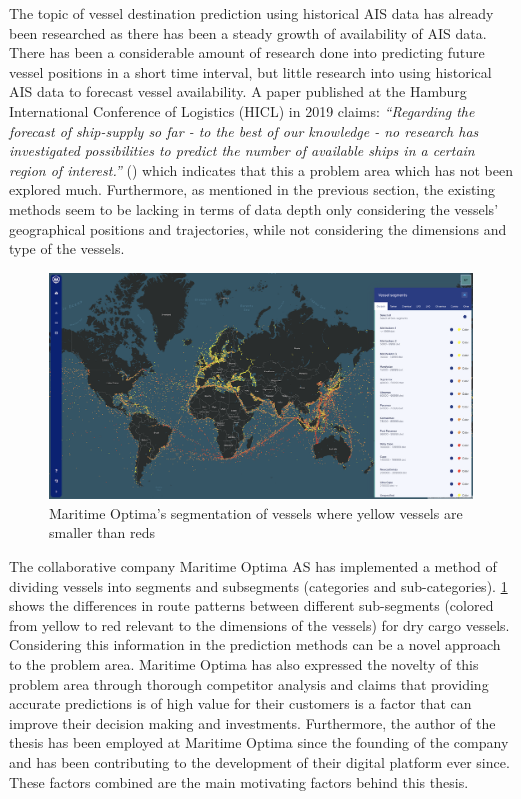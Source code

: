 The topic of vessel destination prediction using historical AIS data has already been researched as there has been a steady growth of availability of AIS data. There has been a considerable amount of research done into predicting future vessel positions in a short time interval, but little research into using historical AIS data to forecast vessel availability. A paper published at the Hamburg International Conference of Logistics (HICL) in 2019 claims: \textit{“Regarding the forecast of ship-supply so far - to the best of our knowledge - no research has investigated possibilities to predict the number of available ships in a certain region of interest.”} (\cite{lechtenberg2019}) which indicates that this a problem area which has not been explored much. Furthermore, as mentioned in the previous section, the existing methods seem to be lacking in terms of data depth only considering the vessels’ geographical positions and trajectories, while not considering the dimensions and type of the vessels.

\begin{figure}[htbp]  %
    \centering
    \includegraphics[width=.89\textwidth]{figures/segment_map}
    \caption[Map of NTNU Campuses]{Maritime Optima’s segmentation of vessels where yellow vessels are smaller than reds}
    \label{fig:segment_map}
\end{figure}

The collaborative company Maritime Optima AS has implemented a method of dividing vessels into segments and subsegments (categories and sub-categories). \cref{fig:segment_map} shows the differences in route patterns between different sub-segments (colored from yellow to red relevant to the dimensions of the vessels) for dry cargo vessels. Considering this information in the prediction methods can be a novel approach to the problem area. Maritime Optima has also expressed the novelty of this problem area through thorough competitor analysis and claims that providing accurate predictions is of high value for their customers is a factor that can improve their decision making and investments. Furthermore, the author of the thesis has been employed at Maritime Optima since the founding of the company and has been contributing to the development of their digital platform ever since. These factors combined are the main motivating factors behind this thesis.

